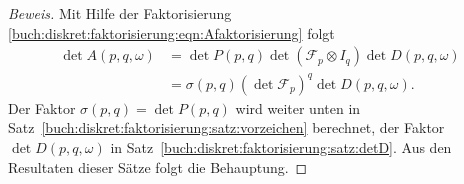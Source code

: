 \begin{proof}[Beweis]
Mit Hilfe der Faktorisierung 
\eqref{buch:diskret:faktorisierung:eqn:Afaktorisierung}
folgt
\begin{align*}
\det A(p,q,\omega)
&=
\det P(p,q)
\det (\mathscr{F}_p\otimes I_q)
\det D(p,q,\omega)
\\
&=
\sigma(p,q) (\det\mathscr{F}_p)^q \det D(p,q,\omega).
\end{align*}
Der Faktor $\sigma(p,q)=\det P(p,q)$ wird weiter unten in
Satz~\eqref{buch:diskret:faktorisierung:satz:vorzeichen}
berechnet, der Faktor $\det D(p,q,\omega)$ in
Satz~\eqref{buch:diskret:faktorisierung:satz:detD}.
Aus den Resultaten dieser Sätze folgt die Behauptung.

\end{proof}
